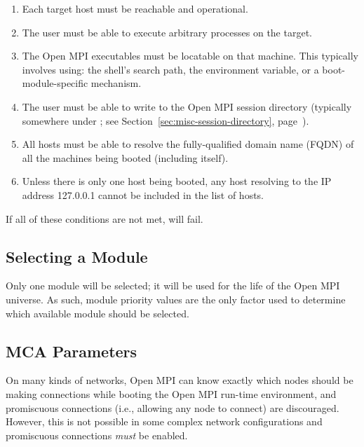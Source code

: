 \begin{enumerate}
\item Each target host must be reachable and operational.
  
\item The user must be able to execute arbitrary processes on the
  target.
  
\item The Open MPI executables must be locatable on that machine.  This
  typically involves using: the shell's search path, the
   environment variable, or a boot-module-specific
  mechanism.

\item The user must be able to write to the Open MPI session directory
  (typically somewhere under ; see
  Section~\ref{sec:misc-session-directory},
  page~\pageref{sec:misc-session-directory}).
  
\item All hosts must be able to resolve the fully-qualified domain
  name (FQDN) of all the machines being booted (including itself).
  
\item Unless there is only one host being booted, any host
  resolving to the IP address 127.0.0.1 cannot be included in the list
  of hosts.
\end{enumerate}

If all of these conditions are not met,  will fail.


\subsection{Selecting a  Module}

Only one  module will be selected; it will be used for the
life of the Open MPI universe.  As such, module priority values are the
only factor used to determine which available module should be
selected.


\subsection{ MCA Parameters}

On many kinds of networks, Open MPI can know exactly which nodes should be
making connections while booting the Open MPI run-time environment, and
promiscuous connections (i.e., allowing any node to connect) are
discouraged.  However, this is not possible in some complex network
configurations and promiscuous connections {\em must} be enabled.
  
